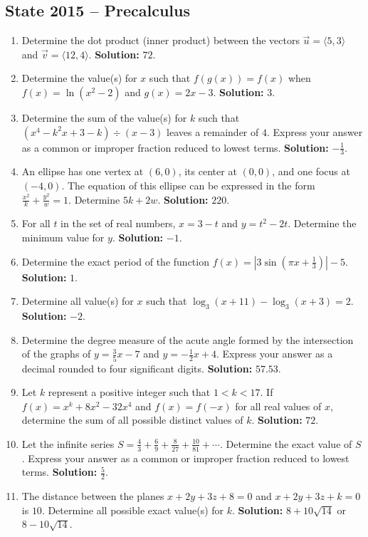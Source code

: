 \documentclass[10pt]{article}
\begin{document}
\subsection*{State 2015 -- Precalculus}
\begin{enumerate}
\item Determine the dot product (inner product) between the vectors $\vec u=\langle5,3\rangle$ and $\vec v=\langle12,4\rangle$. \textbf{Solution:} $72$.
\item Determine the value(s) for $x$ such that $f(g(x))=f(x)$ when $f(x)=\ln(x^2-2)$ and $g(x)=2x-3$. \textbf{Solution:} $3$.
\item Determine the sum of the value(s) for $k$ such that $(x^4-k^2x+3-k)\div(x-3)$ leaves a remainder of $4$. Express your answer as a common or improper fraction reduced to lowest terms. \textbf{Solution:} $-\frac13$.
\item An ellipse has one vertex at $(6,0)$, its center at $(0,0)$, and one focus at $(-4,0)$. The equation of this ellipse can be expressed in the form $\frac{x^2}{k}+\frac{y^2}{w}=1$. Determine $5k+2w$. \textbf{Solution:} $220$.
\item For all $t$ in the set of real numbers, $x=3-t$ and $y=t^2-2t$. Determine the minimum value for $y$. \textbf{Solution:} $-1$.
\item Determine the exact period of the function $f(x)=\left|3\sin\left(\pi x+\frac13\right)\right|-5$. \textbf{Solution:} $1$.
\item Determine all value(s) for $x$ such that $\log_3(x+11)-\log_3(x+3)=2$. \textbf{Solution:} $-2$.
\item Determine the degree measure of the acute angle formed by the intersection of the graphs of $y=\frac35x-7$ and $y=-\frac12x+4$. Express your answer as a decimal rounded to four significant digits. \textbf{Solution:} $57.53$.
\item Let $k$ represent a positive integer such that $1<k<17$. If $f(x)=x^k+8x^2-32x^4$ and $f(x)=f(-x)$ for all real values of $x$, determine the sum of all possible distinct values of $k$. \textbf{Solution:} $72$.
\item Let the infinite series $S=\frac43+\frac69+\frac8{27}+\frac{10}{81}+\cdots$. Determine the exact value of $S$. Express your answer as a common or improper fraction reduced to lowest terms. \textbf{Solution:} $\frac52$.
\item The distance between the planes $x+2y+3z+8=0$ and $x+2y+3z+k=0$ is $10$. Determine all possible exact value(s) for $k$. \textbf{Solution:} $8+10\sqrt{14}$ or $8-10\sqrt{14}$.

\end{enumerate}
\end{document}

